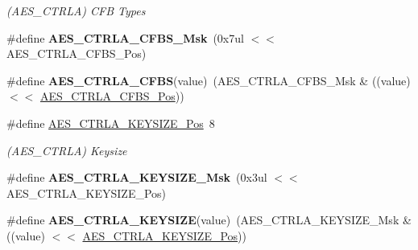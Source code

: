 \begin{DoxyCompactItemize}
\begin{DoxyCompactList}\small\item\em (A\+E\+S\+\_\+\+C\+T\+R\+L\+A) C\+F\+B Types \end{DoxyCompactList}\item 
\hypertarget{group___s_a_m_l21___a_e_s_ga11e5bc2f420bdf81b9b81216e49a5a28}{}\#define {\bfseries A\+E\+S\+\_\+\+C\+T\+R\+L\+A\+\_\+\+C\+F\+B\+S\+\_\+\+Msk}~(0x7ul $<$$<$ A\+E\+S\+\_\+\+C\+T\+R\+L\+A\+\_\+\+C\+F\+B\+S\+\_\+\+Pos)\label{group___s_a_m_l21___a_e_s_ga11e5bc2f420bdf81b9b81216e49a5a28}

\item 
\hypertarget{group___s_a_m_l21___a_e_s_ga23d866b63035e135a0d6ade57b445677}{}\#define {\bfseries A\+E\+S\+\_\+\+C\+T\+R\+L\+A\+\_\+\+C\+F\+B\+S}(value)~(A\+E\+S\+\_\+\+C\+T\+R\+L\+A\+\_\+\+C\+F\+B\+S\+\_\+\+Msk \& ((value) $<$$<$ \hyperlink{group___s_a_m_l21___a_e_s_gaed0081b2f8068882e43b04bd39c0558f}{A\+E\+S\+\_\+\+C\+T\+R\+L\+A\+\_\+\+C\+F\+B\+S\+\_\+\+Pos}))\label{group___s_a_m_l21___a_e_s_ga23d866b63035e135a0d6ade57b445677}

\item 
\hypertarget{group___s_a_m_l21___a_e_s_ga48a5ec79fc1a2dddbed967d4322fb98f}{}\#define \hyperlink{group___s_a_m_l21___a_e_s_ga48a5ec79fc1a2dddbed967d4322fb98f}{A\+E\+S\+\_\+\+C\+T\+R\+L\+A\+\_\+\+K\+E\+Y\+S\+I\+Z\+E\+\_\+\+Pos}~8\label{group___s_a_m_l21___a_e_s_ga48a5ec79fc1a2dddbed967d4322fb98f}

\begin{DoxyCompactList}\small\item\em (A\+E\+S\+\_\+\+C\+T\+R\+L\+A) Keysize \end{DoxyCompactList}\item 
\hypertarget{group___s_a_m_l21___a_e_s_gae1e87b18adcf08e1d0ccb376655f9002}{}\#define {\bfseries A\+E\+S\+\_\+\+C\+T\+R\+L\+A\+\_\+\+K\+E\+Y\+S\+I\+Z\+E\+\_\+\+Msk}~(0x3ul $<$$<$ A\+E\+S\+\_\+\+C\+T\+R\+L\+A\+\_\+\+K\+E\+Y\+S\+I\+Z\+E\+\_\+\+Pos)\label{group___s_a_m_l21___a_e_s_gae1e87b18adcf08e1d0ccb376655f9002}

\item 
\hypertarget{group___s_a_m_l21___a_e_s_gad7fe55824672554d8f4753435bed64e7}{}\#define {\bfseries A\+E\+S\+\_\+\+C\+T\+R\+L\+A\+\_\+\+K\+E\+Y\+S\+I\+Z\+E}(value)~(A\+E\+S\+\_\+\+C\+T\+R\+L\+A\+\_\+\+K\+E\+Y\+S\+I\+Z\+E\+\_\+\+Msk \& ((value) $<$$<$ \hyperlink{group___s_a_m_l21___a_e_s_ga48a5ec79fc1a2dddbed967d4322fb98f}{A\+E\+S\+\_\+\+C\+T\+R\+L\+A\+\_\+\+K\+E\+Y\+S\+I\+Z\+E\+\_\+\+Pos}))\label{group___s_a_m_l21___a_e_s_gad7fe55824672554d8f4753435bed64e7}


\end{DoxyCompactItemize}

